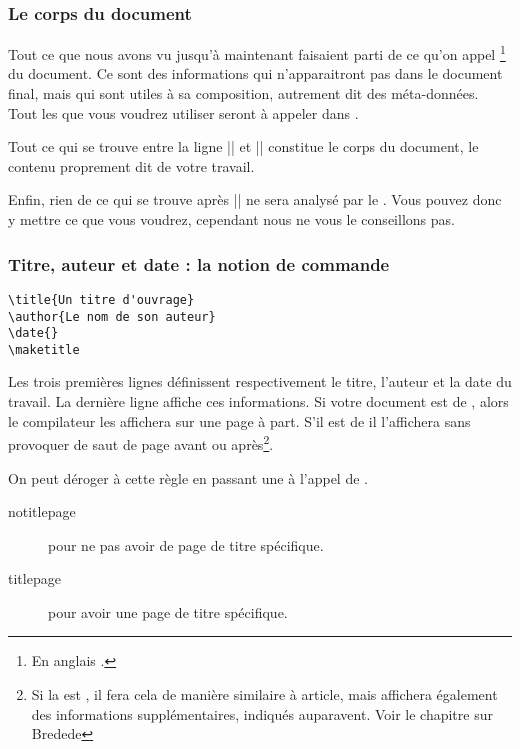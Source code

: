 \subsubsection{Le corps du document}

Tout ce que nous avons vu jusqu'à maintenant faisaient parti de ce qu'on appel \footnote{En anglais .} du document. Ce sont des informations qui n'apparaitront pas dans le document final, mais qui sont utiles à sa composition, autrement dit des méta-données. Tout les  que vous voudrez utiliser seront à appeler dans .

Tout ce qui se trouve entre la ligne || et || constitue le corps du document, le contenu proprement dit de votre travail.

Enfin, rien de ce qui se trouve après || ne sera analysé par le . Vous pouvez donc y mettre ce que vous voudrez, cependant nous ne vous le conseillons pas.

\subsubsection{Titre, auteur et date : la notion de commande}

\begin{verbatim}
\title{Un titre d'ouvrage}
\author{Le nom de son auteur}
\date{}
\maketitle
\end{verbatim}

Les trois premières lignes définissent respectivement le titre, l'auteur et la date du travail.  
La dernière ligne affiche ces informations. Si votre document est de  , alors le compilateur les affichera sur une page à part. S'il est de   il l'affichera sans provoquer de saut de page avant ou après\footnote{Si la  est , il fera cela de manière similaire à article, mais affichera également des informations supplémentaires, indiqués auparavent. Voir le chapitre sur Bredede}.

On peut déroger à cette règle en passant une  à l'appel de .
\begin{description}
\item[notitlepage] pour ne pas avoir de page de titre spécifique.
\item[titlepage] pour avoir une page de titre spécifique.
\end{description}

